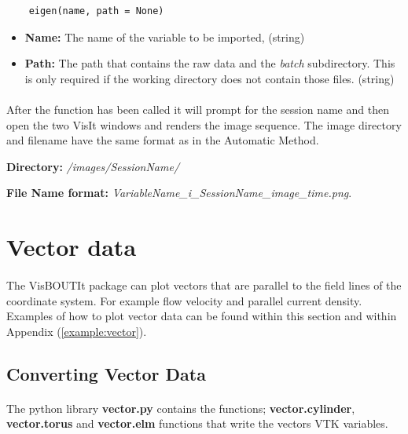 \documentclass[12pt,a4paper]{article}
\begin{document}
	\begin{verbatim}
	eigen(name, path = None)
	\end{verbatim}
	
	\begin{itemize}
		\item{\textbf{Name:} The name of the variable to be imported, (string)}
		\item{\textbf{Path:} The path that contains the raw data and the \textit{batch} subdirectory. This is only required if the working directory does not contain those files. (string)}
	\end{itemize}
	
	\paragraph{}
	After the function has been called it will prompt for the session name and then open the two VisIt windows and renders the image sequence. The image directory and filename have the same format as in the Automatic Method. 
	
	\textbf{Directory:} \textit{/images/SessionName/}
	
	\textbf{File Name format:} \textit{VariableName\_i\_SessionName\_image\_time.png}.
	
\section{Vector data}
\label{sec:vector}
\paragraph{}
The VisBOUTIt package can plot vectors that are parallel to the field lines of the coordinate system. For example flow velocity and parallel current density. Examples of how to plot vector data can be found within this section and within Appendix (\ref{example:vector}).

\subsection{Converting Vector Data}
\paragraph{}
The python library \textbf{vector.py} contains the functions; \textbf{vector.cylinder}, \textbf{vector.torus} and \textbf{vector.elm} functions that write the vectors VTK variables.
\end{document}
